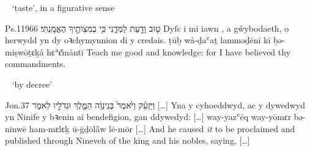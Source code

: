 \begin{frame}{\ex\  ‘taste’, in a figurative sense}
\begin{example}{Ps.}{119}{66}{}{}
	\quoling
	{ט֤וּב  וָדַ֣עַת לַמְּדֵ֑נִי כִּ֖י בְמִצְוֺתֶ֣יךָ הֶאֱמָֽנְתִּי׃}
	{Dyſc i mi iawn , a gŵybodaeth, o herwydd yn dy oꝛchymynnion di y credais.}
	{ṭūḇ  wå-ḏaʿaṯ lamməḏēnī kī ḇə-miṣwōṯɛḵå hɛʾɛ̆måntī}
	{Teach me good  and knowledge: for I have believed thy commandments.}
\end{example}
\end{frame}



\begin{frame}{\ex\  ‘by decree’}
\begin{example}{Jon.}{3}{7}{}{}
	\quoling
	{וַיַּזְעֵ֗ק וַיֹּ֙אמֶר֙ בְּנִֽינְוֵ֔ה  הַמֶּ֛לֶךְ וּגְדֹלָ֖יו לֵאמֹ֑ר […]}
	{Yna y cyhoeddwyd, ac y dywedwyd yn Ninife  y bꝛenin ai bendefigion, gan ddywedyd: […]}
	{way-yazʿēq way-yōmɛr bə-nīnwē  ham-mɛlɛḵ ū-ḡḏōlå̄w lē-mōr […]}
	{And he caused \textit{it} to be proclaimed and published through Nineveh  of the king and his nobles, saying, […]}
\end{example}
\end{frame}
